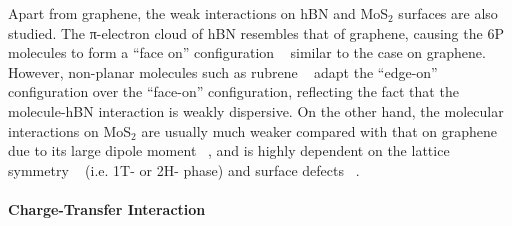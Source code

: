Apart from graphene, the weak interactions on hBN and
MoS\(_{\text{2}}\) surfaces are also studied. The π-electron cloud of
hBN resembles that of graphene, causing the 6P molecules to form a
``face on'' configuration ~\cite{Matkovic_2016_6P_hBN} similar to the
case on graphene. However, non-planar molecules such as rubrene
~\cite{Lee_2014_rubene_hBN} adapt the ``edge-on'' configuration over the ``face-on'' configuration, reflecting the fact
that the molecule-hBN interaction is weakly dispersive.
%
On the other hand, the molecular
interactions on MoS$_{2}$ are usually much weaker compared with that on
graphene due to its large dipole moment ~\cite{Rajan_2016_wett_mos2},
and is highly dependent on the lattice symmetry
~\cite{Shen_2017_DFT_mos2_pent} (i.e. 1T- or 2H- phase) and surface
defects ~\cite{Jariwala_2016_Mos2_pentacene,
  Kim_2016_trap_Mos2_pent}.

\paragraph{Charge-Transfer Interaction}
\label{sec:orgebfad7b}

